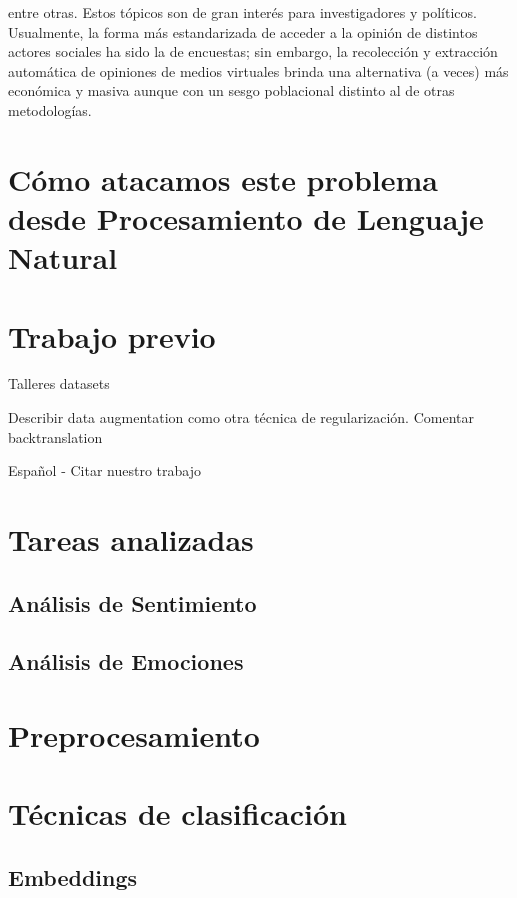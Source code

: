 entre otras. Estos tópicos son de gran interés para investigadores y políticos. Usualmente, la forma más estandarizada de acceder a la opinión de distintos actores sociales ha sido la de encuestas; sin embargo, la recolección y extracción automática de opiniones de medios virtuales brinda una alternativa (a veces) más económica y masiva aunque con un sesgo poblacional distinto al de otras metodologías.

\section{Cómo atacamos este problema desde Procesamiento de Lenguaje Natural}



\section{Trabajo previo}

Talleres
datasets


Describir data augmentation como otra técnica de regularización. Comentar backtranslation

Español
- Citar nuestro trabajo

\section{Tareas analizadas}
\subsection{Análisis de Sentimiento}

\subsection{Análisis de Emociones}


\section{Preprocesamiento}

\section{Técnicas de clasificación}

\subsection{Embeddings}


